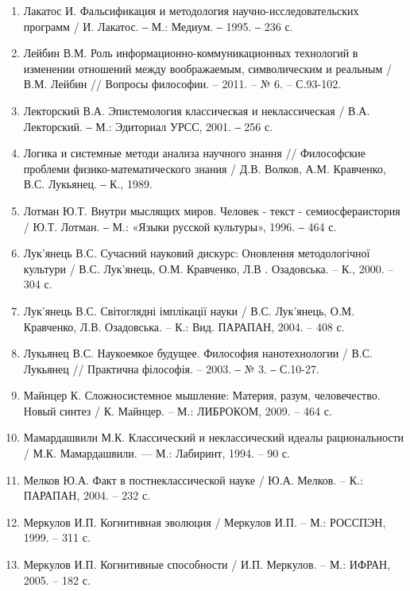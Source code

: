 \begin{enumerate}
\item Лакатос И. Фальсификация и методология научно-исследовательских
программ / И. Лакатос. ‒ М.: Медиум. ‒ 1995. ‒ 236 с.

\item Лейбин В.М. Роль информационно-коммуникационных технологий в
изменении отношений между воображаемым, символическим и реальным /
В.М. Лейбин // Вопросы философии. – 2011. – № 6. – С.93-102.

\item Лекторский В.А. Эпистемология классическая и неклассическая / В.А.
Лекторский. ‒ М.: Эдиториал УРСС, 2001. ‒ 256 с.

\item Логика и системные методи анализа научного знання // Философские
проблеми физико-математического знания / Д.В. Волков, А.М. Кравченко, В.С.
Лукьянец. ‒ К., 1989.

\item Лотман Ю.Т. Внутри мыслящих миров. Человек - текст - семиосфераистория
/ Ю.Т. Лотман. ‒ М.: «Языки русской культуры», 1996. ‒ 464 с.

\item Лук’янець В.С. Сучасний науковий дискурс: Оновлення методологічної
культури / В.С. Лук’янець, О.М. Кравченко, Л.В . Озадовська. – К., 2000. – 304
с.

\item Лук’янець В.С. Світоглядні імплікації науки / В.С. Лук’янець, О.М.
Кравченко, Л.В. Озадовська. – К.: Вид. ПАРАПАН, 2004. – 408 с.

\item Лукьянец В.С. Наукоемкое будущее. Философия нанотехнологии / В.С.
Лукьянец // Практична філософія. – 2003. ‒ № 3. ‒ С.10-27.

\item Майнцер К. Сложносистемное мышление: Материя, разум,
человечество. Новый синтез / К. Майнцер. – М.: ЛИБРОКОМ, 2009. – 464 с.

\item Мамардашвили М.К. Классический и неклассический идеалы
рациональности / М.К. Мамардашвили. --- М.: Лабиринт, 1994. – 90 с.

\item Мелков Ю.А. Факт в постнеклассической науке / Ю.А. Мелков. – К.:
ПАРАПАН, 2004. – 232 с.

\item Меркулов И.П. Когнитивная эволюция / Меркулов И.П. – М.:
РОССПЭН, 1999. – 311 с.

\item Меркулов И.П. Когнитивные способности / И.П. Меркулов. – М.:
ИФРАН, 2005. – 182 с.


\end{enumerate}
